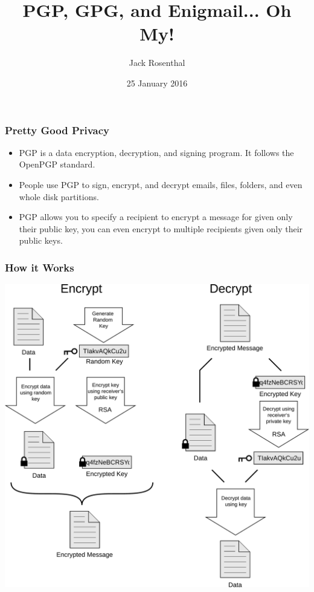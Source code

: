 \documentclass{beamer}
\title{PGP, GPG, and Enigmail... Oh My!}
\author{Jack Rosenthal}
\institute{CSM Linux Users Group}
\date{25 January 2016}
\begin{document}
\begin{frame}
    \maketitle
\end{frame}

\begin{frame}
    \frametitle{Pretty Good Privacy}
    \begin{itemize}[<+->]
        \item PGP is a data encryption, decryption, and signing program. It
            follows the OpenPGP standard.
        \item People use PGP to sign, encrypt, and decrypt emails, files,
            folders, and even whole disk partitions.
        \item PGP allows you to specify a recipient to encrypt a message for
            given only their public key, you can even encrypt to multiple
            recipients given only their public keys.
    \end{itemize}
\end{frame}

\begin{frame}
    \frametitle{How it Works}
    \begin{center}
        \includegraphics[width=0.7\linewidth]{graphics/PGP_diagram.pdf}
    \end{center}
\end{frame}
\end{document}

